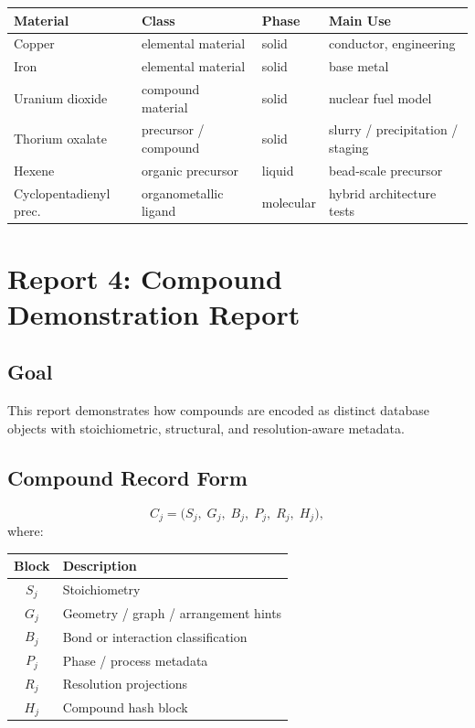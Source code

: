 \documentclass[11pt, a4paper, oneside]{article}
\begin{document}
\begin{center}
\small
\begin{tabular}{@{} l l l l @{}}
\toprule
\textbf{Material} & \textbf{Class} & \textbf{Phase} & \textbf{Main Use}\\
\midrule
Copper                & elemental material         & solid     & conductor, engineering\\
Iron                  & elemental material         & solid     & base metal\\
Uranium dioxide       & compound material          & solid     & nuclear fuel model\\
Thorium oxalate       & precursor / compound       & solid     & slurry / precipitation / staging\\
Hexene                & organic precursor          & liquid    & bead-scale precursor\\
Cyclopentadienyl prec.& organometallic ligand      & molecular & hybrid architecture tests\\
\bottomrule
\end{tabular}
\end{center}


\section{Report 4: Compound Demonstration Report}
\label{sec:report4}

\subsection{Goal}

This report demonstrates how compounds are encoded as distinct database objects
with stoichiometric, structural, and resolution-aware metadata.

\subsection{Compound Record Form}

\begin{equation}
\label{eq:compound_record}
C_j = \bigl(S_j,\; G_j,\; B_j,\; P_j,\; R_j,\; H_j\bigr),
\end{equation}
where:
\begin{center}
\begin{tabular}{@{} cl @{}}
\toprule
\textbf{Block} & \textbf{Description}\\
\midrule
$S_j$ & Stoichiometry\\
$G_j$ & Geometry / graph / arrangement hints\\
$B_j$ & Bond or interaction classification\\
$P_j$ & Phase / process metadata\\
$R_j$ & Resolution projections\\
$H_j$ & Compound hash block\\
\bottomrule
\end{tabular}
\end{center}
\end{document}
